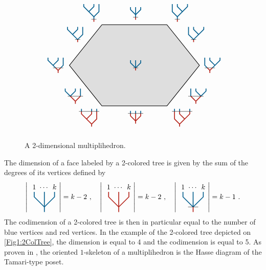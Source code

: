 \documentclass[twoside, 11pt]{amsart}
\theoremstyle{remark}
\begin{document}
\begin{figure}[h]
\[
\begin{tikzpicture}[xscale=0.8,yscale=1]
\draw[thick] (-2,2)--(2,2)--(4,0)--(2,-2)--(-2,-2)--(-4,0)--cycle;
\draw[fill, opacity=0.12] (-2,2)--(2,2)--(4,0)--(2,-2)--(-2,-2)--(-4,0)--cycle;
\draw (-2,2) node[above left] {$\TreeLa$};
\draw (2,2) node[above right] {$\TreeRa$};
\draw (-2,-2) node[below left] {$\TreeLc$};
\draw (2,-2) node[below right] {$\TreeRc$};
\draw (-4.2,0) node[left] {$\TreeLb$};
\draw (4,0) node[right] {$\TreeRb$};
\draw (-3,1) node[above left] {$\TreeLab$};
\draw (-3,-1) node[below left] {$\TreeLbc$};
\draw (3,1) node[above right] {$\TreeRab$};
\draw (3,-1) node[below right] {$\TreeRbc$};
\draw (0,2.1) node[above] {$\TreeCa$};
\draw (0,-2.1) node[below] {$\TreeCb$};
\draw (0,0) node  {$\TreeCab$};
\end{tikzpicture}
\]
\caption{A 2-dimensional multiplihedron.}
\label{Fig4:J3}
\end{figure}

The dimension of a face labeled by a 2-colored tree is given by the sum of the degrees of its vertices defined by 
\[
\left|{\vcenter{\hbox{
\begin{tikzpicture}[scale=0.5]
\draw[very thick, MidnightBlue] (0,-0.5) -- (0,1.5);
\draw[very thick, MidnightBlue] (0,0) -- (-1,1)--(-1,1.5);
\draw[very thick, MidnightBlue] (0,0) -- (1,1)--(1,1.5);
\draw (1,1.5) node[above] {$k$};
\draw (-1,1.5) node[above] {$1$};
\draw (0,1.5) node[above] {$\cdots$};
\end{tikzpicture}}}}\right|=k-2\ , \quad 
\left|{\vcenter{\hbox{
\begin{tikzpicture}[scale=0.5]
\draw[very thick, BrickRed] (0,-0.5) -- (0,1.5);
\draw[very thick, BrickRed] (0,0) -- (-1,1)--(-1,1.5);
\draw[very thick, BrickRed] (0,0) -- (1,1)--(1,1.5);
\draw (1,1.5) node[above] {$k$};
\draw (-1,1.5) node[above] {$1$};
\draw (0,1.5) node[above] {$\cdots$};
\end{tikzpicture}}}}\right|=k-2\ , \quad 
\left|{\vcenter{\hbox{
\begin{tikzpicture}[scale=0.5]
\draw[very thick, MidnightBlue] (0,0) -- (0,1.5);
\draw[very thick, MidnightBlue] (0,0) -- (-1,1)--(-1,1.5);
\draw[very thick, MidnightBlue] (0,0) -- (1,1)--(1,1.5);
\draw[very thick, BrickRed] (0,0) -- (0,-0.5);
\draw (-0.5,0)--(0.5,0);
\draw (1,1.5) node[above] {$k$};
\draw (-1,1.5) node[above] {$1$};
\draw (0,1.5) node[above] {$\cdots$};
\end{tikzpicture}}}}\right|=k-1\ .
\]
The codimension of a 2-colored tree is then in particular equal to the number of blue vertices and red vertices. 
In the example of the 2-colored tree depicted on \cref{Fig1:2ColTree}, the dimension is equal to 4 and the codimension is equal to 5. 
As proven in \cite[Proposition 117]{CP22}, the oriented $1$-skeleton of a multiplihedron is the Hasse diagram of the Tamari-type poset. 
\end{document}
